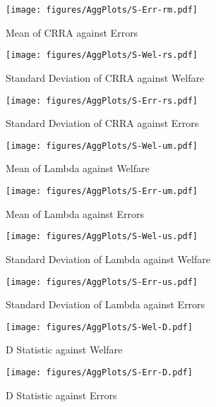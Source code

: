 \documentclass[../main.tex]{subfiles}
\begin{document}
\begin{figure}[hp!]
	\center
	\caption{Mean of CRRA against Errors}
	\texttt{[image: figures/AggPlots/S-Err-rm.pdf]}
	\label{fig:S-Err-rm}
\end{figure}

\begin{figure}[hp!]
	\center
	\caption{Standard Deviation of CRRA against Welfare}
	\texttt{[image: figures/AggPlots/S-Wel-rs.pdf]}
	\label{fig:S-Wel-rs}
\end{figure}

\begin{figure}[hp!]
	\center
	\caption{Standard Deviation of CRRA against Errors}
	\texttt{[image: figures/AggPlots/S-Err-rs.pdf]}
	\label{fig:S-Err-rs}
\end{figure}

\begin{figure}[hp!]
	\center
	\caption{Mean of Lambda against Welfare}
	\texttt{[image: figures/AggPlots/S-Wel-um.pdf]}
	\label{fig:S-Wel-um}
\end{figure}

\begin{figure}[hp!]
	\center
	\caption{Mean of Lambda against Errors}
	\texttt{[image: figures/AggPlots/S-Err-um.pdf]}
	\label{fig:S-Err-um}
\end{figure}

\begin{figure}[hp!]
	\center
	\caption{Standard Deviation of Lambda against Welfare}
	\texttt{[image: figures/AggPlots/S-Wel-us.pdf]}
	\label{fig:S-Wel-us}
\end{figure}

\begin{figure}[hp!]
	\center
	\caption{Standard Deviation of Lambda against Errors}
	\texttt{[image: figures/AggPlots/S-Err-us.pdf]}
	\label{fig:S-Err-us}
\end{figure}

\begin{figure}[hp!]
	\center
	\caption{D Statistic against Welfare}
	\texttt{[image: figures/AggPlots/S-Wel-D.pdf]}
	\label{fig:D-Wel-smooth}
\end{figure}

\begin{figure}[hp!]
	\center
	\caption{D Statistic against Errors}
	\texttt{[image: figures/AggPlots/S-Err-D.pdf]}
	\label{fig:D-Err-smooth}
\end{figure}

\newpage

\onlyinsubfile{
\newpage
\printbibliography[segment=3, heading=subbibliography]
}
\end{document}
